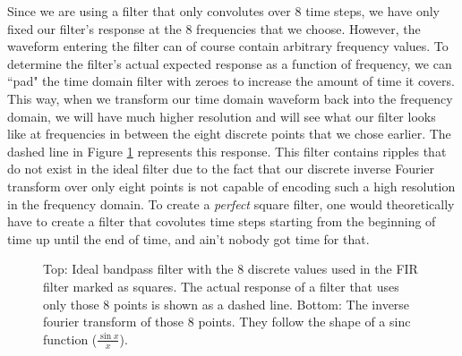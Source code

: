 \documentclass[12pt]{article}
\begin{document}
Since we are using a filter that only convolutes over 8 time steps, we have only fixed our filter's response at the 8 frequencies that we choose. However, the waveform entering the filter can of course contain arbitrary frequency values. To determine the filter's actual expected response as a function of frequency, we can ``pad" the time domain filter with zeroes to increase the amount of time it covers. This way, when we transform our time domain waveform back into the frequency domain, we will have much higher resolution and will see what our filter looks like at frequencies in between the eight discrete points that we chose earlier. The dashed line in Figure \ref{fig:fir} represents this response. This filter contains ripples that do not exist in the ideal filter due to the fact that our discrete inverse Fourier transform over only eight points is not capable of encoding such a high resolution in the frequency domain. To create a \textit{perfect} square filter, one would theoretically have to create a filter that covolutes time steps starting from the beginning of time up until the end of time, and ain't nobody got time for that.
\begin{figure}[H]
  
\caption[SODUMB]{Top: Ideal bandpass filter with the 8 discrete values used in the FIR filter marked as squares. The actual response of a filter that uses only those 8 points is shown as a dashed line. Bottom: The inverse fourier transform of those 8 points. They follow the shape of a sinc function ($\frac{\sin{x}}{x}$).}
\label{fig:fir}
\end{figure}
\end{document}

